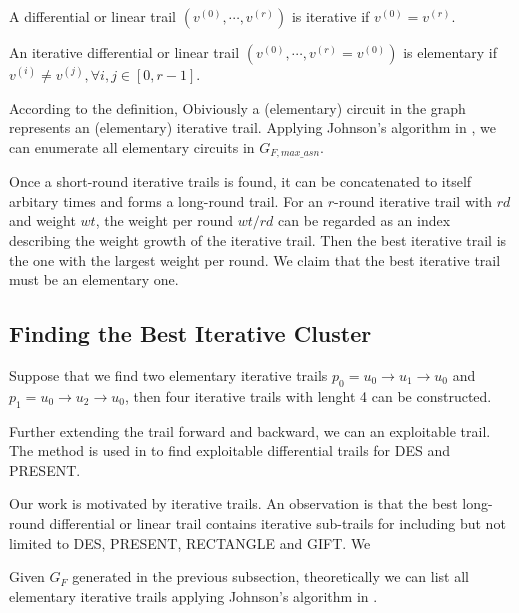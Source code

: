 \begin{definition}
	A differential or linear trail $(v^{(0)},\cdots,v^{(r)})$ is iterative if $v^{(0)}=v^{(r)}$.
\end{definition}

\begin{definition}
    An iterative differential or linear trail $(v^{(0)},\cdots,v^{(r)}=v^{(0)})$ is elementary if $v^{(i)}\neq v^{(j)},\forall i,j\in [0,r-1]$.
\end{definition}

According to the definition, Obiviously a (elementary) circuit in the graph represents an (elementary) iterative trail. Applying Johnson's algorithm in \cite{J75}, we can enumerate all elementary circuits in $G_{F,max\_asn}$. 

Once a short-round iterative trails is found, it can be concatenated to itself arbitary times and forms a long-round trail. For an $r$-round iterative trail with $rd$ and weight $wt$, the weight per round $wt/rd$ can be regarded as an index describing the weight growth of the iterative trail. Then the best iterative trail is the one with the largest weight per round. We claim that the best iterative trail must be an elementary one. 

\subsection{Finding the Best Iterative Cluster}

\begin{example}
	Suppose that we find two elementary iterative trails $p_0=u_0\rightarrow u_1\rightarrow u_0$ and $p_1=u_0\rightarrow u_2 \rightarrow u_0$, then four iterative trails with lenght 4 can be constructed.
\end{example}


Further extending the trail forward and backward, we can an exploitable trail. The method is used in \cite{BS91,BS92,W08} to find exploitable differential trails for DES and PRESENT. 

Our work is motivated by iterative trails. An observation is that the best long-round differential or linear trail contains iterative sub-trails for including but not limited to DES, PRESENT, RECTANGLE and GIFT. We 

Given $G_F$ generated in the previous subsection, theoretically we can list all elementary iterative trails applying Johnson's algorithm in \cite{J75}. 


